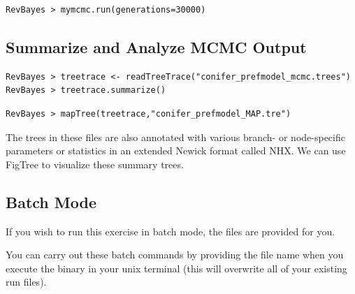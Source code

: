 {\tt \begin{snugshade*}
\begin{lstlisting}
RevBayes > mymcmc.run(generations=30000)
\end{lstlisting}
\end{snugshade*}}


\bigskip
\subsection{Summarize and Analyze MCMC Output}

{\tt \begin{snugshade*}
\begin{lstlisting}
RevBayes > treetrace <- readTreeTrace("conifer_prefmodel_mcmc.trees")
RevBayes > treetrace.summarize()
\end{lstlisting}
\end{snugshade*}}


{\tt \begin{snugshade*}
\begin{lstlisting}
RevBayes > mapTree(treetrace,"conifer_prefmodel_MAP.tre")
\end{lstlisting}
\end{snugshade*}}




The trees in these files are also annotated with various branch- or node-specific parameters or statistics in an extended Newick format called NHX. 
We can use FigTree to visualize these summary trees. 


\bigskip
\subsection*{Batch Mode}

If you wish to run this exercise in batch mode, the files are provided for you. 

You can carry out these batch commands by providing the file name when you execute the  binary in your unix terminal (this will overwrite all of your existing run files).

